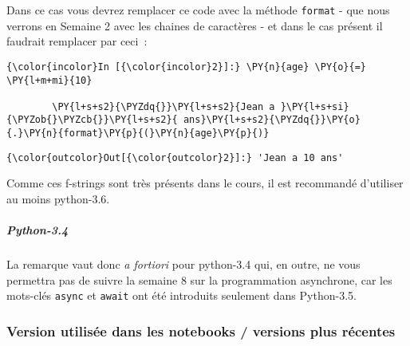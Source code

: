 \begin{Shaded}
\begin{Highlighting}[]
\OperatorTok{>>>}\OperatorTok{=} 
\OperatorTok{>>>} \SpecialCharTok{\{}\SpecialCharTok{\}}
    \SpecialCharTok{\{}\SpecialCharTok{\}}
                      \OperatorTok{^}
\end{Highlighting}
\end{Shaded}

    Dans ce cas vous devrez remplacer ce code avec la méthode
\texttt{format} - que nous verrons en Semaine 2 avec les chaines de
caractères - et dans le cas présent il faudrait remplacer par ceci~:

    \begin{Verbatim}[commandchars=\\\{\}]
{\color{incolor}In [{\color{incolor}2}]:} \PY{n}{age} \PY{o}{=} \PY{l+m+mi}{10}
        
        \PY{l+s+s2}{\PYZdq{}}\PY{l+s+s2}{Jean a }\PY{l+s+si}{\PYZob{}\PYZcb{}}\PY{l+s+s2}{ ans}\PY{l+s+s2}{\PYZdq{}}\PY{o}{.}\PY{n}{format}\PY{p}{(}\PY{n}{age}\PY{p}{)}
\end{Verbatim}


\begin{Verbatim}[commandchars=\\\{\}]
{\color{outcolor}Out[{\color{outcolor}2}]:} 'Jean a 10 ans'
\end{Verbatim}
            
    Comme ces f-strings sont très présents dans le cours, il est recommandé
d'utiliser au moins python-3.6.

    \hypertarget{python-3.4}{%
\subparagraph{Python-3.4}\label{python-3.4}}

    La remarque vaut donc \emph{a fortiori} pour python-3.4 qui, en outre,
ne vous permettra pas de suivre la semaine 8 sur la programmation
asynchrone, car les mots-clés \texttt{async} et \texttt{await} ont été
introduits seulement dans Python-3.5.

    \hypertarget{version-utilisuxe9e-dans-les-notebooks-versions-plus-ruxe9centes}{%
\subsubsection{Version utilisée dans les notebooks / versions plus
récentes}\label{version-utilisuxe9e-dans-les-notebooks-versions-plus-ruxe9centes}}

